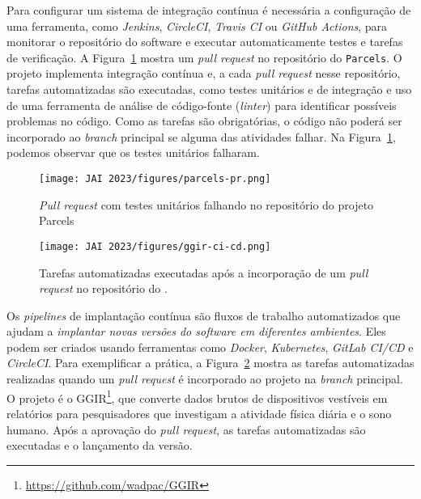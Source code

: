 Para configurar um sistema de integração contínua é necessária a configuração de uma ferramenta, como \textit{Jenkins}, \textit{CircleCI}, \textit{Travis CI} ou \textit{GitHub Actions}, para monitorar o repositório do software e executar automaticamente testes e tarefas de verificação.
A Figura~\ref{fig:ci:cd:parcels} mostra um \textit{pull request} no repositório do \RSw \texttt{Parcels}. 
O projeto implementa integração contínua e, a cada \textit{pull request} nesse repositório, 
tarefas automatizadas são executadas, como testes unitários e de integração e uso de uma ferramenta de análise de código-fonte (\textit{linter}) para identificar possíveis problemas no código. 
Como as tarefas são obrigatórias, o código não poderá ser incorporado ao \textit{branch} principal se alguma das atividades falhar. Na Figura~\ref{fig:ci:cd:parcels}, podemos observar que  os testes unitários falharam.

\begin{figure}[tb]
    \centering
    \texttt{[image: JAI 2023/figures/parcels-pr.png]}
    \caption{\textit{Pull request} com testes unitários falhando no repositório do projeto Parcels}
    \label{fig:ci:cd:parcels}
\end{figure}

\begin{figure}[tb]
    \centering
    \texttt{[image: JAI 2023/figures/ggir-ci-cd.png]}
    \caption{Tarefas automatizadas executadas após a incorporação de um \textit{pull request} no repositório do \RS.}
    \label{fig:ci:cd:ggir}
\end{figure}

Os \textit{pipelines} de implantação contínua são fluxos de trabalho automatizados que ajudam a \textit{implantar novas versões do software em diferentes ambientes}. Eles podem ser criados usando ferramentas como \textit{Docker}, \textit{Kubernetes}, \textit{GitLab CI/CD} e \textit{CircleCI}.
Para exemplificar a prática, a Figura~\ref{fig:ci:cd:ggir} mostra as tarefas automatizadas realizadas quando um \textit{pull request} é incorporado ao projeto na \textit{branch} principal. O projeto é o \RSw GGIR\footnote{\url{https://github.com/wadpac/GGIR}}, que converte dados brutos de dispositivos vestíveis em relatórios para pesquisadores que investigam a atividade física diária e o sono humano. Após a aprovação do \textit{pull request}, as tarefas automatizadas são executadas e o lançamento da versão.

